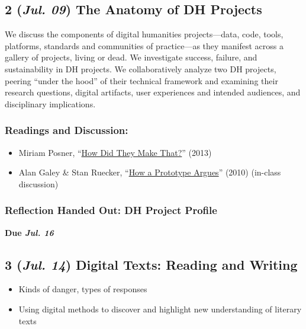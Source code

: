 \documentclass[11pt]{article}
\begin{document}
\subsection*{2 (\textit{Jul. 09}) The Anatomy of DH Projects}
\label{sec:org45247a0}
We discuss the components of digital humanities projects—data, code, tools, platforms, standards and communities of practice—as they manifest across a gallery of projects, living or dead. We investigate success, failure, and sustainability in DH projects. We collaboratively analyze two DH projects, peering “under the hood” of their technical framework and examining their research questions, digital artifacts, user experiences and intended audiences, and disciplinary implications.

\subsubsection*{Readings and Discussion:}
\label{sec:org4dc0b0b}
\begin{itemize}
\item Miriam Posner, “\href{http://miriamposner.com/blog/how-did-they-make-that/}{How Did They Make That?}” (2013)
\item Alan Galey \& Stan Ruecker, “\href{https://doi.org/10.1093/llc/fqq021}{How a Prototype Argues}” (2010) (in-class discussion)
\end{itemize}
\subsubsection*{Reflection Handed Out: DH Project Profile}
\label{sec:org423c71a}
\textbf{Due \textit{Jul. 16}}
\subsection*{3 (\textit{Jul. 14}) Digital Texts: Reading and Writing}
\label{sec:orgd5251bb}

\begin{itemize}
\item Kinds of danger, types of responses
\item Using digital methods to discover and highlight new understanding of literary texts
\end{itemize}
\end{document}
